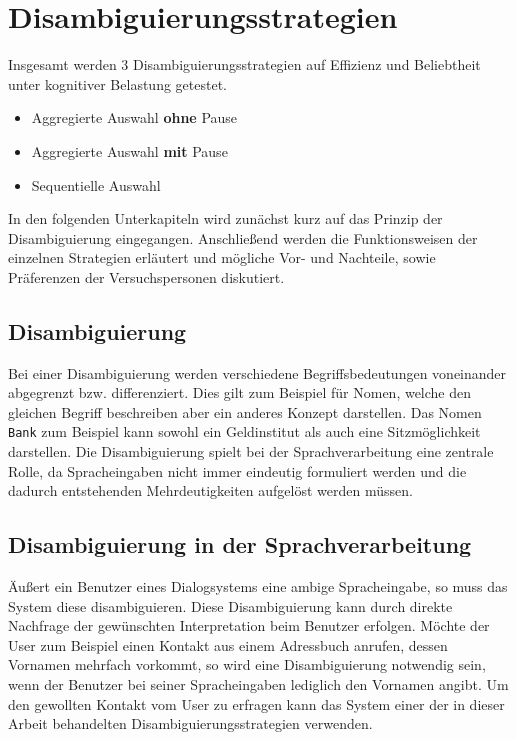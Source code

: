 \documentclass[12pt,a4paper]{scrartcl}
\begin{document}
\section{Disambiguierungsstrategien}
Insgesamt werden 3 Disambiguierungsstrategien auf Effizienz und Beliebtheit unter kognitiver Belastung getestet.
\begin{itemize}
\item Aggregierte Auswahl \textbf{ohne} Pause
\item Aggregierte Auswahl \textbf{mit} Pause
\item Sequentielle Auswahl
\end{itemize}
In den folgenden Unterkapiteln wird zunächst kurz auf das Prinzip der Disambiguierung eingegangen. Anschließend werden die Funktionsweisen der einzelnen Strategien erläutert und mögliche Vor- und Nachteile, sowie Präferenzen der Versuchspersonen diskutiert.


\subsection{Disambiguierung}
Bei einer Disambiguierung werden verschiedene Begriffsbedeutungen voneinander abgegrenzt bzw. differenziert. Dies gilt zum Beispiel für Nomen, welche den gleichen Begriff beschreiben aber ein anderes Konzept darstellen. Das Nomen \texttt{Bank} zum Beispiel kann sowohl ein Geldinstitut als auch eine Sitzmöglichkeit darstellen. Die Disambiguierung spielt bei der Sprachverarbeitung eine zentrale Rolle, da Spracheingaben nicht immer eindeutig formuliert werden und die dadurch entstehenden Mehrdeutigkeiten aufgelöst werden müssen. 
\subsection{Disambiguierung in der Sprachverarbeitung}
Äußert ein Benutzer eines Dialogsystems eine ambige Spracheingabe, so muss das System diese disambiguieren. Diese Disambiguierung kann durch direkte Nachfrage der gewünschten Interpretation beim Benutzer erfolgen. 
Möchte der User zum Beispiel einen Kontakt aus einem Adressbuch anrufen, dessen Vornamen mehrfach vorkommt, so wird eine Disambiguierung notwendig sein, wenn der Benutzer bei seiner Spracheingaben lediglich den Vornamen angibt. Um den gewollten Kontakt vom User zu erfragen kann das System einer der in dieser Arbeit behandelten Disambiguierungsstrategien verwenden. 
\end{document}
